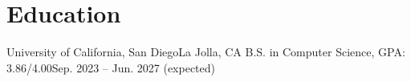 \section{Education}
  \resumeSubHeadingListStart
    \resumeSubheading
      {University of California, San Diego}{La Jolla, CA}
      {B.S. in Computer Science, GPA: 3.86/4.00}{Sep. 2023 -- Jun. 2027 (expected)}
      \resumeItemListStart
      \resumeItemListEnd
  \resumeSubHeadingListEnd
